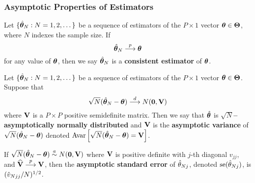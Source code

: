 \documentclass[11pt, oneside, a4paper, article]{article}
\numberwithin{equation}{section}
\begin{document}
\subsubsection{Asymptotic Properties of Estimators}

\begin{defn} 
Let $\{\hat{\boldsymbol{\theta}}_{N} : N=1,2,\dots\}$ be a sequence of estimators of the $P \times 1$ vector $\boldsymbol{\theta} \in \boldsymbol{\Theta}$, where $N$ indexes the sample size.	If 
	\begin{equation}
		\hat{\boldsymbol{\theta}}_{N}  \overset{p}{\longrightarrow}  \boldsymbol{\theta}
	\end{equation}
for any value of $\boldsymbol{\theta}$, then we say $\hat{\boldsymbol{\theta}}_{N}$ is a \textbf{consistent estimator} of $\boldsymbol{\theta}$.
\end{defn}

\begin{defn} 
Let $\{\hat{\boldsymbol{\theta}}_{N} : N=1,2,\dots\}$ be a sequence of estimators of the $P \times 1$ vector $\boldsymbol{\theta} \in \boldsymbol{\Theta}$. Suppose that
\begin{equation} \label{eq:3.3}
		\sqrt{N}( \hat{\boldsymbol{\theta}}_{N} - \boldsymbol{\theta} )
		 \overset{d}{\longrightarrow}  N(\boldsymbol{0}, \mathbf{V})
	\end{equation}
where $\mathbf{V}$ is a $P \times P$ positive semidefinite matrix.
Then we say that $\hat{\boldsymbol{\theta}}$ is \textbf{$\sqrt{N}$--asymptotically normally distributed} and $\mathbf{V}$ is the \textbf{asymptotic variance} of $\sqrt{N}(\hat{\boldsymbol{\theta}}_{N} - \boldsymbol{\theta})$ denoted 
$\text{Avar} \left[ \sqrt{N}(\hat{\boldsymbol{\theta}}_{N} - \boldsymbol{\theta}) = \mathbf{V} \right]$.
\end{defn}

\begin{defn} 
If $\sqrt{N}(\hat{\boldsymbol{\theta}}_{N} - \boldsymbol{\theta})  \overset{a}{\sim}  N(\boldsymbol{0}, \mathbf{V} )$ where $\mathbf{V}$ is positive definite with $j$-th diagonal $v_{jj}$, and $\widehat{\mathbf{V}}  \overset{p}{\longrightarrow}  \mathbf{V}$, then the \textbf{asymptotic standard error} of $\hat{\theta}_{Nj}$, denoted $\text{se}(\hat{\theta}_{Nj})$, is $(\hat{v}_{Njj}/N)^{1/2}$.
\end{defn}
\end{document}
